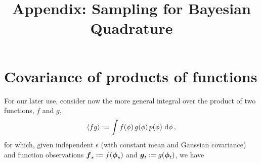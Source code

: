 \documentclass{article}
\title{Appendix: Sampling for Bayesian Quadrature}
\begin{document}
 


\section{Covariance of products of functions}
For our later use, consider now the more general integral over the product of two functions, $f$ and $g$,
$$\inty{f g} \deq \int f(\phi)\,g(\phi)\,\po{\phi}\,\ud\phi\,,$$ 
for which, given independent \gp s (with constant mean and Gaussian covariance) and function observations $\vf_{s} \deq f(\vph_{s})$ and  $\vg_{t} \deq g(\vph_{t})$, we have
% 
\end{document}
